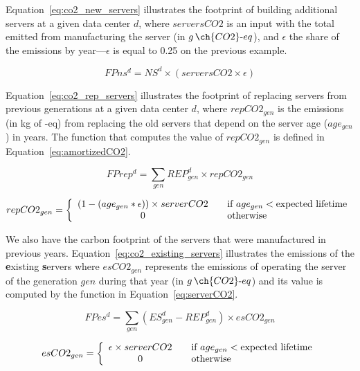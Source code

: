 Equation~\eqref{eq:co2_new_servers} illustrates the footprint of building additional servers at a given data center $d$, where $serversCO2$ is an input with the total  emitted from manufacturing the server (in $g\,\ch{CO2}\text{-}eq$), and $\epsilon$ the share of the emissions by year---$\epsilon$ is equal to 0.25 on the previous example.

\begin{equation} \label{eq:co2_new_servers}
FPns^d = NS^d \times (serversCO2 \times \epsilon)	
\end{equation}

Equation~\eqref{eq:co2_rep_servers} illustrates the footprint of replacing servers from previous generations at a given data center $d$, where $repCO2_{gen}$ is the emissions (in kg of -eq) from replacing the old servers that depend on the server age ($age_{gen}$) in years. The function that computes the value of  $repCO2_{gen}$  is defined in Equation~\eqref{eq:amortizedCO2}.

\begin{equation} \label{eq:co2_rep_servers}
FPrep^d = \sum_{gen} REP_{gen}^d  \times repCO2_{gen}
\end{equation}


\begin{equation} \label{eq:amortizedCO2}
repCO2_{gen} =  \left\{ 
  \begin{array}{ c l }
    (1 - (age_{gen} * \epsilon)) \times serverCO2   & \quad \textrm{if $age_{gen}$}  <  \textrm{expected lifetime}      \\
    0     & \quad  \textrm{otherwise}   \\
  \end{array}
\right.
\end{equation}


We also have the carbon footprint of the servers that were manufactured in previous years. Equation~\eqref{eq:co2_existing_servers} illustrates the emissions of the \textbf{e}xisting \textbf{s}ervers where $esCO2_{gen}$ represents the emissions of operating the server of the generation $gen$ during that year (in $g\,\ch{CO2}\text{-}eq$) and its value is computed by the function in Equation~\eqref{eq:serverCO2}.


\begin{equation} \label{eq:co2_existing_servers}
FPes^d = \sum_{gen} (ES_{gen}^d - REP_{gen}^d)  \times esCO2_{gen}
\end{equation}


\begin{equation} \label{eq:serverCO2}
esCO2_{gen} =  \left\{ 
  \begin{array}{ c l }
    \epsilon \times serverCO2   & \quad \textrm{if $age_{gen}$}    < \textrm{expected lifetime}   \\
    0     & \quad \textrm{otherwise  } \\
  \end{array}
\right.
\end{equation}




